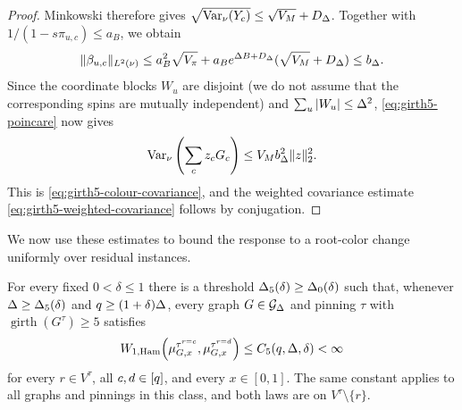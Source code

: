 \begin{proof}
Minkowski therefore gives
$\sqrt{\operatorname{Var}_\nu(Y_c)}\le\sqrt{V_M}+D_\Deg$.
Together with
$1/(1-s\pi_{u,c})\le a_B$, we obtain
\begin{equation}\label{eq:girth5-beta-bound}
 \|\beta_{u,c}\|_{L^2(\nu)}\le a_B^2\sqrt{V_\pi}
 +a_Be^{\Deg B+D_\Deg}(\sqrt{V_M}+D_\Deg)\le b_\Deg.
\end{equation}
Since the coordinate blocks $W_u$ are disjoint (we do not assume that the
corresponding spins are mutually independent) and $\sum_u|W_u|\le\Deg^2$,
\eqref{eq:girth5-poincare} now gives
\[
 \operatorname{Var}_\nu\left(\sum_cz_cG_c\right)\le V_Mb_\Deg^2\|z\|_2^2.
\]
This is \eqref{eq:girth5-colour-covariance}, and the weighted covariance estimate \eqref{eq:girth5-weighted-covariance} follows by
conjugation.
\end{proof}

We now use these estimates to bound the response to a root-color change
uniformly over residual instances.

\begin{theorem}
\label{thm:girth5-ci}
For every fixed $0<\delta\le1$ there is a threshold
$\Deg_5(\delta)\ge\Deg_0(\delta)$ such that, whenever
$\Deg\ge\Deg_5(\delta)$ and
$q\ge(1+\delta)\Deg$, every graph $G\in\Gdeg$ and pinning $\tau$ with
$\operatorname{girth}(G^\tau)\ge5$ satisfies
\[
 \WHam\!\left(
   \mupin{G}{\tau^{r=c}}{x},
   \mupin{G}{\tau^{r=d}}{x}
 \right)\le C_5(q,\Deg,\delta)<\infty
\]
for every $r\in V^\tau$, all $c,d\in\colours$, and every $x\in[0,1]$.
The same constant applies to all graphs and pinnings in this class, and
both laws are on $V^\tau\setminus\{r\}$.
\end{theorem}

